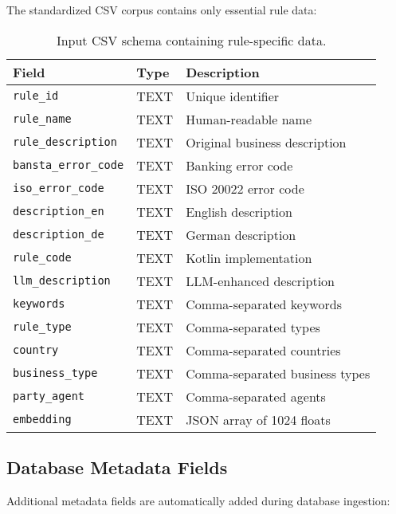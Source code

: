 The standardized CSV corpus contains only essential rule data:

\begin{table}[!htbp]
\centering
\small
\begin{tabular}{p{3.5cm}p{2cm}p{6cm}}
\toprule
\textbf{Field} & \textbf{Type} & \textbf{Description} \\
\midrule
\texttt{rule\_id} & TEXT & Unique identifier \\
\texttt{rule\_name} & TEXT & Human-readable name \\
\texttt{rule\_description} & TEXT & Original business description \\
\texttt{bansta\_error\_code} & TEXT & Banking error code \\
\texttt{iso\_error\_code} & TEXT & ISO 20022 error code \\
\texttt{description\_en} & TEXT & English description \\
\texttt{description\_de} & TEXT & German description \\
\texttt{rule\_code} & TEXT & Kotlin implementation \\
\texttt{llm\_description} & TEXT & LLM-enhanced description \\
\texttt{keywords} & TEXT & Comma-separated keywords \\
\texttt{rule\_type} & TEXT & Comma-separated types \\
\texttt{country} & TEXT & Comma-separated countries \\
\texttt{business\_type} & TEXT & Comma-separated business types \\
\texttt{party\_agent} & TEXT & Comma-separated agents \\
\texttt{embedding} & TEXT & JSON array of 1024 floats \\
\bottomrule
\end{tabular}
\caption{Input CSV schema containing rule-specific data.}
\label{tab:csv-schema}
\end{table}

\subsection{Database Metadata Fields}

Additional metadata fields are automatically added during database ingestion:


